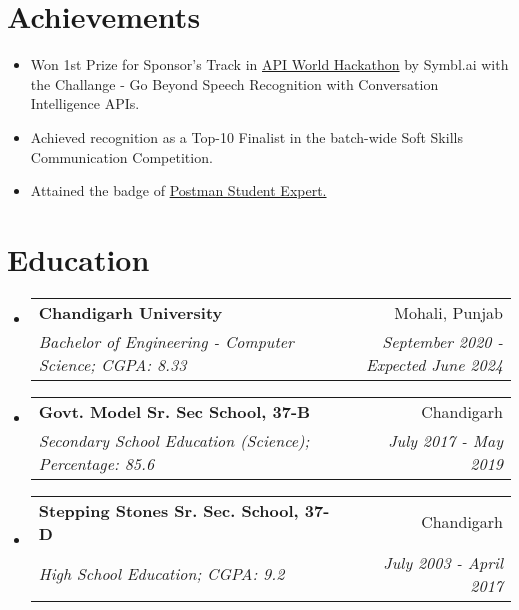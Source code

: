 \documentclass[apaper,20pt]{article}
\makeatletter
\newcommand{\MYhref}[3][primaryColor]{\href{#2}{{\color{#1}#3}}}
\newcommand{\resumeSubheading}[4]{
  \vspace{-1pt}\item
    \begin{tabular*}{0.97\textwidth}{l@{\extracolsep{\fill}}r}
      \textbf{#1} & #2 \\
      \textit{#3} & \textit{#4} \\
    \end{tabular*}\vspace{-5pt}
}
\newcommand{\resumeSubHeadingListStart}{\begin{itemize}[leftmargin=*]}
\newcommand{\resumeSubHeadingListEnd}{\end{itemize}}
\makeatother
\begin{document}

\vspace{-3pt}

\section{Achievements}
\begin{itemize}[labelsep=*,label=$\circ$,leftmargin=0.9pc]
	\item {Won 1st Prize for Sponsor's Track in {\MYhref{https://devpost.com/software/feedback-prime-kbg8um}{API World Hackathon}} by Symbl.ai with the Challange - Go Beyond Speech Recognition with Conversation Intelligence APIs.}
 \vspace{-5pt}
     \item {Achieved recognition as a Top-10 Finalist in the batch-wide Soft Skills Communication Competition.}
\vspace{-5pt}
	\item {Attained the badge of {\MYhref{https://badgr.com/public/assertions/DNG85AU6SYWaX6XO5gkoDw?identity__email=nitish.sharma1186@gmail.com}{Postman Student Expert.}}}
\end{itemize}


\vspace{-6pt}

\section{Education}
\resumeSubHeadingListStart
\resumeSubheading
{Chandigarh University}{Mohali, Punjab}
{Bachelor of Engineering - Computer Science;  CGPA: 8.33}{September 2020 - Expected June 2024}
\vspace{0pt}
\resumeSubheading
{Govt. Model Sr. Sec School, 37-B}{Chandigarh}
{Secondary School Education (Science);  Percentage: 85.6}{July 2017 - May 2019}
\vspace{0pt}
\resumeSubheading
{Stepping Stones Sr. Sec. School, 37-D}{Chandigarh}
{High School Education;  CGPA: 9.2}{July 2003 - April 2017}
\resumeSubHeadingListEnd
\end{document}
